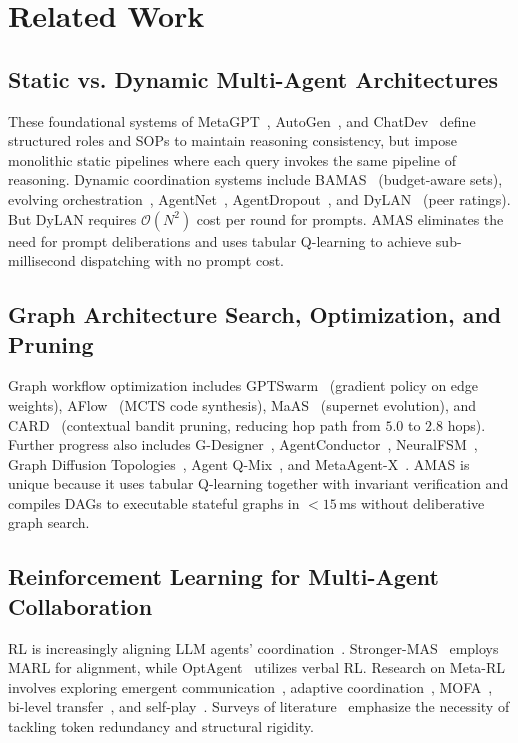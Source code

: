 ﻿\documentclass[conference]{IEEEtran}
\begin{document}
\section{Related Work}
\label{sec:related_work}

\subsection{Static vs. Dynamic Multi-Agent Architectures}
These foundational systems of MetaGPT~\cite{hong2024metagpt}, AutoGen~\cite{wu2023autogen}, and ChatDev~\cite{qian2024chatdev} define structured roles and SOPs to maintain reasoning consistency, but impose monolithic static pipelines where each query invokes the same pipeline of reasoning. Dynamic coordination systems include BAMAS~\cite{Yang2026BAMAS} (budget-aware sets), evolving orchestration~\cite{dang2025multiagent}, AgentNet~\cite{yang2025agentnet}, AgentDropout~\cite{xiao2026agentdropout}, and DyLAN~\cite{liu2024dylan} (peer ratings). But DyLAN requires $\mathcal{O}(N^2)$ cost per round for prompts. AMAS eliminates the need for prompt deliberations and uses tabular Q-learning to achieve sub-millisecond dispatching with no prompt cost.

\subsection{Graph Architecture Search, Optimization, and Pruning}
Graph workflow optimization includes GPTSwarm~\cite{zhuge2024gptswarm} (gradient policy on edge weights), AFlow~\cite{zhang2024aflow} (MCTS code synthesis), MaAS~\cite{Zhang2025MaAS} (supernet evolution), and CARD~\cite{Li2025AdaptiveGraphPruning} (contextual bandit pruning, reducing hop path from $5.0$ to $2.8$ hops). Further progress also includes G-Designer~\cite{zhang2025gdesigner}, AgentConductor~\cite{wang2026agentconductor}, NeuralFSM~\cite{wang2026neuralfsm}, Graph Diffusion Topologies~\cite{Jiang2026GTD}, Agent Q-Mix~\cite{jiang2026agentqmix}, and MetaAgent-X~\cite{Zhang2026MetaAgentX}. AMAS is unique because it uses tabular Q-learning together with invariant verification and compiles DAGs to executable stateful graphs in $<15$\,ms without deliberative graph search.

\subsection{Reinforcement Learning for Multi-Agent Collaboration}
RL is increasingly aligning LLM agents' coordination~\cite{liu2026llm,Zhao2026StrongerMAS,bi2025optagent,Wan2025ReMA,Yang2026LearningToDeliberate,Zhou2026ResMAS,rjoub2026aamc}. Stronger-MAS~\cite{Zhao2026StrongerMAS} employs MARL for alignment, while OptAgent~\cite{bi2025optagent} utilizes verbal RL. Research on Meta-RL involves exploring emergent communication~\cite{Kashikar2025MetaRL}, adaptive coordination~\cite{Huang2024AdaptiveMARL}, MOFA~\cite{Fu2026MOFA}, bi-level transfer~\cite{zhang2025bilevel}, and self-play~\cite{Mali2026SelfPlay,li2020adaptive}. Surveys of literature~\cite{Cao2025TNNLSSurvey,sun2024llmmarl,lee2026survey} emphasize the necessity of tackling token redundancy and structural rigidity.
\end{document}
